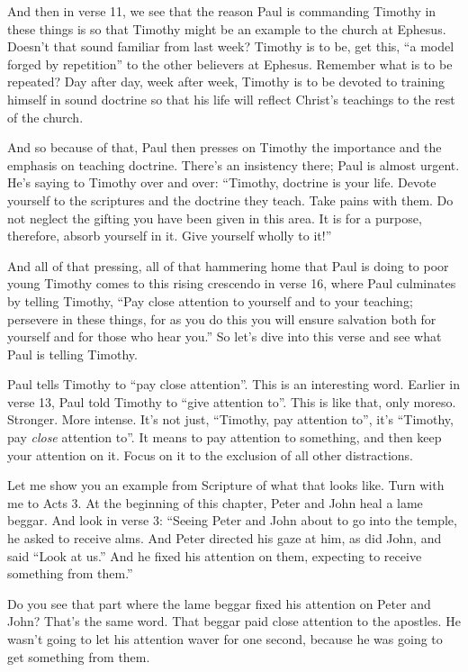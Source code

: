 \documentclass[letterpaper, 12pt]{article}
\begin{document}
    And then in verse 11, we see that the reason Paul is commanding
    Timothy in these things is so that Timothy might be an example to
    the church at Ephesus. Doesn't that sound familiar from last week?
    Timothy is to be, get this, ``a model forged by repetition'' to the
    other believers at Ephesus. Remember what is to be repeated? Day
    after day, week after week, Timothy is to be devoted to training
    himself in sound doctrine so that his life will reflect Christ's
    teachings to the rest of the church. 

    And so because of that, Paul then presses on Timothy the importance
    and the emphasis on teaching doctrine. There's an insistency there;
    Paul is almost urgent. He's saying to Timothy over and over:
    ``Timothy, doctrine is your life. Devote yourself to the scriptures
    and the doctrine they teach. Take pains with them. Do not neglect
    the gifting you have been given in this area. It is for a purpose,
    therefore, absorb yourself in it. Give yourself wholly to it!''

    And all of that pressing, all of that hammering home that Paul is
    doing to poor young Timothy comes to this rising crescendo in verse
    16, where Paul culminates by telling Timothy, ``Pay close attention
    to yourself and to your teaching; persevere in these things, for as
    you do this you will ensure salvation both for yourself and for
    those who hear you.'' So let's dive into this verse and see what
    Paul is telling Timothy.

    Paul tells Timothy to ``pay close attention''. This is an
    interesting word. Earlier in verse 13, Paul told Timothy to ``give
    attention to''. This is like that, only moreso. Stronger. More
    intense. It's not just, ``Timothy, pay attention to'', it's
    ``Timothy, pay \emph{close} attention to''. It means to pay
    attention to something, and then keep your attention on it. Focus on
    it to the exclusion of all other distractions.

    Let me show you an example from Scripture of what that looks like.
    Turn with me to Acts 3. At the beginning of this chapter, Peter and
    John heal a lame beggar. And look in verse 3: ``Seeing Peter and
    John about to go into the temple, he asked to receive alms. And
    Peter directed his gaze at him, as did John, and said ``Look at
    us.'' And he fixed his attention on them, expecting to receive
    something from them.''

    Do you see that part where the lame beggar fixed his attention on
    Peter and John? That's the same word. That beggar paid close
    attention to the apostles. He wasn't going to let his attention
    waver for one second, because he was going to get something from
    them.
\end{document}
